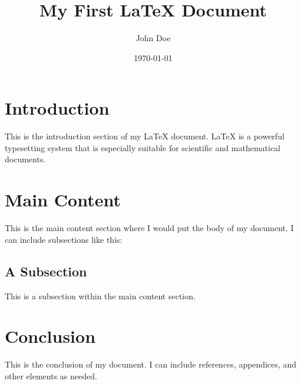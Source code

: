 \documentclass{article}
\title{My First LaTeX Document}
\author{John Doe}
\date{\today}
\begin{document}
\maketitle
\section{Introduction}
This is the introduction section of my LaTeX document. LaTeX is a powerful typesetting system that is especially suitable for scientific and mathematical documents.

\section{Main Content}
This is the main content section where I would put the body of my document. I can include subsections like this:
\subsection{A Subsection}
This is a subsection within the main content section.

\section{Conclusion}
This is the conclusion of my document. I can include references, appendices, and other elements as needed.
\end{document}
